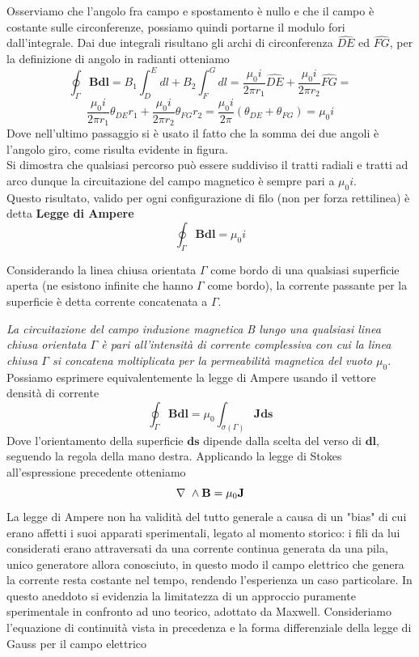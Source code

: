 \documentclass[
10pt, %
a4paper, %
oneside, %
headinclude,footinclude, %
BCOR5mm, %
]{scrartcl}
\begin{document}
Osserviamo che l'angolo fra campo e spostamento è nullo e che il campo è costante sulle circonferenze, possiamo quindi portarne il modulo fori dall'integrale. Dai due integrali risultano gli archi di circonferenza \(\widehat{DE}\) ed \(\widehat{FG}\), per la definizione di angolo in radianti otteniamo
\[\oint_{\Gamma}\mathbf{B}\mathbf{dl}=B_1\int_{D}^{E}dl+B_2\int_{F}^{G}dl= \frac{\mu_0 i}{2\pi r_1}\widehat{DE}+\frac{\mu_0 i}{2\pi r_2}\widehat{FG}=\]
 \[\frac{\mu_0 i}{2\pi r_1}\theta_{DE}r_1+\frac{\mu_0 i}{2\pi r_2}\theta_{FG}r_2=\frac{\mu_0 i}{2\pi}(\theta_{DE}+\theta_{FG})=\mu_0 i \]
Dove nell'ultimo passaggio si è usato il fatto che la somma dei due angoli è l'angolo giro, come risulta evidente in figura.\\
Si dimostra che qualsiasi percorso può essere suddiviso il tratti radiali e tratti ad arco dunque la circuitazione del campo magnetico è sempre pari a \(\mu_0 i\).\\
Questo risultato, valido per ogni configurazione di filo (non per forza rettilinea) è detta \textbf{Legge di Ampere}
\[\oint_{\Gamma}\mathbf{B}\mathbf{dl}=\mu_0 i\] 
\begin{definizione}
	Considerando la linea chiusa orientata $\Gamma$ come bordo di una qualsiasi superficie aperta (ne esistono infinite che hanno $\Gamma$ come bordo), la corrente passante per la superficie è detta corrente concatenata a $\Gamma$.
\end{definizione}
\textit{La circuitazione del campo induzione magnetica B lungo una qualsiasi linea chiusa orientata \(\Gamma\) è pari all'intensità di corrente complessiva con cui la linea chiusa $\Gamma$ si concatena moltiplicata per la permeabilità magnetica del vuoto $\mu_0$}.\\
Possiamo esprimere equivalentemente la legge di Ampere usando il vettore densità di corrente
\[\oint_{\Gamma}\mathbf{B}\mathbf{dl}= \mu_0\int_{\sigma(\Gamma)}\mathbf{J}\mathbf{ds}\]
Dove l'orientamento della superficie $\mathbf{ds}$ dipende dalla scelta del verso di $\mathbf{dl}$, seguendo la regola della mano destra. 
Applicando la legge di Stokes all'espressione precedente otteniamo
\[\mathbf{\nabla\ }\wedge\mathbf{B}=\mu_0\mathbf{J}\]
La legge di Ampere non ha validità del tutto generale a causa di un "bias" di cui erano affetti i suoi apparati sperimentali, legato al momento storico: i fili da lui considerati erano attraversati da una corrente continua generata da una pila, unico generatore allora conosciuto, in questo modo il campo elettrico che genera la corrente resta costante nel tempo, rendendo l'esperienza un caso particolare. In questo aneddoto si evidenzia la limitatezza di un approccio puramente sperimentale in confronto ad uno teorico, adottato da Maxwell. Consideriamo l'equazione di continuità vista in precedenza e la forma differenziale della legge di Gauss per il campo elettrico
\end{document}
